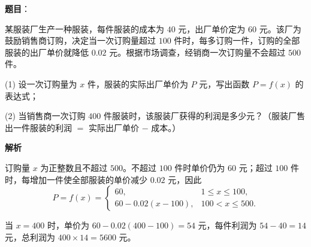 \begin{answer}

\textbf{题目}：

某服装厂生产一种服装，每件服装的成本为 $40$ 元，出厂单价定为 $60$ 元。该厂为鼓励销售商订购，决定当一次订购量超过 $100$ 件时，每多订购一件，订购的全部服装的出厂单价就降低 $0.02$ 元。根据市场调查，经销商一次订购量不会超过 $500$ 件。

(1) 设一次订购量为 $x$ 件，服装的实际出厂单价为 $P$ 元，写出函数 $P=f(x)$ 的表达式；

(2) 当销售商一次订购 $400$ 件服装时，该服装厂获得的利润是多少元？（服装厂售出一件服装的利润 $=$ 实际出厂单价 $-$ 成本。）

\textbf{解析}


订购量 $x$ 为正整数且不超过 $500$。不超过 $100$ 件时单价仍为 $60$ 元；超过 $100$ 件时，每增加一件使全部服装的单价减少 $0.02$ 元，因此
\nopagebreak[4]
\[
P=f(x)=\begin{cases}
60,&1\le x\le100,\\
60-0.02(x-100),&100<x\le500.
\end{cases}
\]

当 $x=400$ 时，单价为 $60-0.02(400-100)=54$ 元，每件利润为 $54-40=14$ 元，总利润为 $400\times14=5600$ 元。



\end{answer}
